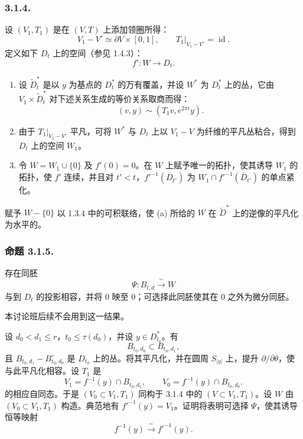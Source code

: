 \subsubsection*{3.1.4.}
设 $(V_1,T_1)$ 是在 $(V,T)$ 上添加领圈所得：
\[
V_1-V^\circ\simeq\partial V\times[0,1],
\qquad
T_1|_{V_1-V^\circ}=\operatorname{id}.
\]
定义如下 $D_t$ 上的空间（参见 1.4.3）：
\[
f':W\longrightarrow D_t.
\]

\begin{enumerate}[label=(\alph*)]
\item 设 $\widetilde D_t^*$ 是以 $y$ 为基点的 $D_t^*$ 的万有覆盖，并设 $W^*$ 为 $D_t^*$ 上的丛，它由 $V_1\times\widetilde D_t^*$ 对下述关系生成的等价关系取商而得：
\[
  (v,y)\sim(T_1v,e^{2\pi i}y).
  \]
\item 由于 $T_1|_{V_1-V^\circ}$ 平凡，可将 $W^*$ 与 $D_t$ 上以 $V_1-V$ 为纤维的平凡丛粘合，得到 $D_t$ 上的空间 $W_1$。
\item 令 $W=W_1\cup\{0\}$ 及 $f'(0)=0$。在 $W$ 上赋予唯一的拓扑，使其诱导 $W_1$ 的拓扑，使 $f'$ 连续，并且对 $t'<t$，${f'}^{-1}(\overline D_{t'})$ 为
$W_1\cap {f'}^{-1}(\overline D_{t'})$
的单点紧化。
\end{enumerate}

赋予 $W-\{0\}$ 以 1.3.4 中的可积联络，使 (a) 所给的 $W$ 在 $\widetilde D^*$ 上的逆像的平凡化为水平的。

\subsubsection*{命题 3.1.5.}
存在同胚
\[
\Psi:B_{t,d}\xrightarrow{\ \sim\ }W
\]
与到 $D_t$ 的投影相容，并将 $0$ 映至 $0$；可选择此同胚使其在 $0$ 之外为微分同胚。

本讨论班后续不会用到这一结果。

设 $d_0<d_1\leq r$，$t_0\leq\tau(d_0)$，并设 $y\in D_{t_0}^*$。有
\[
B_{t_0,d_0}\subset B_{t_0,d_1},
\]
且 $B_{t_0,d_1}-B_{t_0,d_0}^{\circ}$ 是 $D_{t_0}$ 上的丛。将其平凡化，并在圆周 $S_{|y|}$ 上，提升 $\partial/\partial\theta$，使与此平凡化相容。设 $T_1$ 是
\[
V_1=f^{-1}(y)\cap B_{t_0,d_1},
\qquad
V_0=f^{-1}(y)\cap B_{t_0,d_0}.
\]
的相应自同态。于是 $(V_0\subset V_1,T_1)$ 同构于 3.1.4 中的 $(V\subset V_1,T_1)$。设 $W$ 由 $(V_0\subset V_1,T_1)$ 构造。典范地有 ${f'}^{-1}(y)=V_1$。证明将表明可选择 $\Psi$，使其诱导恒等映射
\[
f^{-1}(y)\xrightarrow{\ \sim\ }{f'}^{-1}(y).
\]

